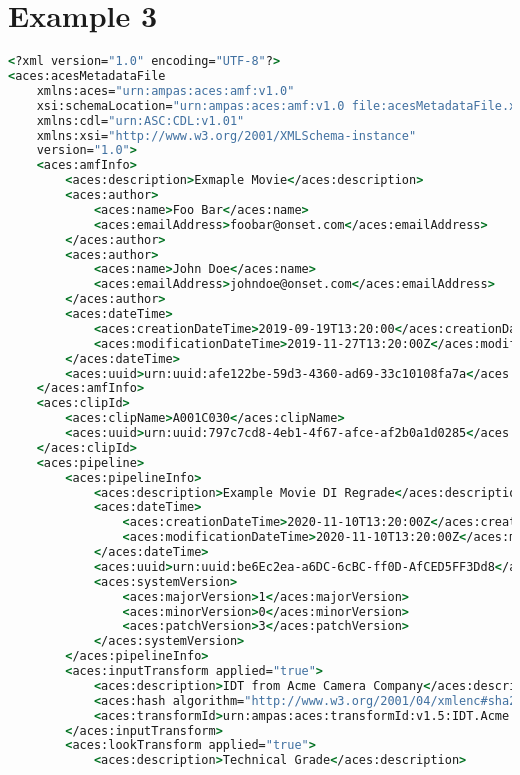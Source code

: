 \section*{Example 3}
\begin{lstlisting}[language=csh]
<?xml version="1.0" encoding="UTF-8"?>
<aces:acesMetadataFile 
    xmlns:aces="urn:ampas:aces:amf:v1.0"
    xsi:schemaLocation="urn:ampas:aces:amf:v1.0 file:acesMetadataFile.xsd"
    xmlns:cdl="urn:ASC:CDL:v1.01"
    xmlns:xsi="http://www.w3.org/2001/XMLSchema-instance"
    version="1.0">
    <aces:amfInfo>
        <aces:description>Exmaple Movie</aces:description>
        <aces:author>
            <aces:name>Foo Bar</aces:name>
            <aces:emailAddress>foobar@onset.com</aces:emailAddress>
        </aces:author>
        <aces:author>
            <aces:name>John Doe</aces:name> 
            <aces:emailAddress>johndoe@onset.com</aces:emailAddress>
        </aces:author>
        <aces:dateTime>
            <aces:creationDateTime>2019-09-19T13:20:00</aces:creationDateTime>
            <aces:modificationDateTime>2019-11-27T13:20:00Z</aces:modificationDateTime>
        </aces:dateTime>
        <aces:uuid>urn:uuid:afe122be-59d3-4360-ad69-33c10108fa7a</aces:uuid>
    </aces:amfInfo>
    <aces:clipId>
        <aces:clipName>A001C030</aces:clipName>
        <aces:uuid>urn:uuid:797c7cd8-4eb1-4f67-afce-af2b0a1d0285</aces:uuid>
    </aces:clipId>
    <aces:pipeline>
        <aces:pipelineInfo>
            <aces:description>Example Movie DI Regrade</aces:description>
            <aces:dateTime>
                <aces:creationDateTime>2020-11-10T13:20:00Z</aces:creationDateTime>
                <aces:modificationDateTime>2020-11-10T13:20:00Z</aces:modificationDateTime>
            </aces:dateTime>
            <aces:uuid>urn:uuid:be6Ec2ea-a6DC-6cBC-ff0D-AfCED5FF3Dd8</aces:uuid>
            <aces:systemVersion>
                <aces:majorVersion>1</aces:majorVersion>
                <aces:minorVersion>0</aces:minorVersion>
                <aces:patchVersion>3</aces:patchVersion>
            </aces:systemVersion>
        </aces:pipelineInfo>
        <aces:inputTransform applied="true">
            <aces:description>IDT from Acme Camera Company</aces:description>
            <aces:hash algorithm="http://www.w3.org/2001/04/xmlenc#sha256">1531ea6ef06c5b0a5bea80c94f60c7b68e3989e3c90b8ebd25c28aa4670c30f8</aces:hash>
            <aces:transformId>urn:ampas:aces:transformId:v1.5:IDT.Acme.Camera.a1.v1</aces:transformId>
        </aces:inputTransform>
        <aces:lookTransform applied="true">
            <aces:description>Technical Grade</aces:description>

\end{lstlisting}
